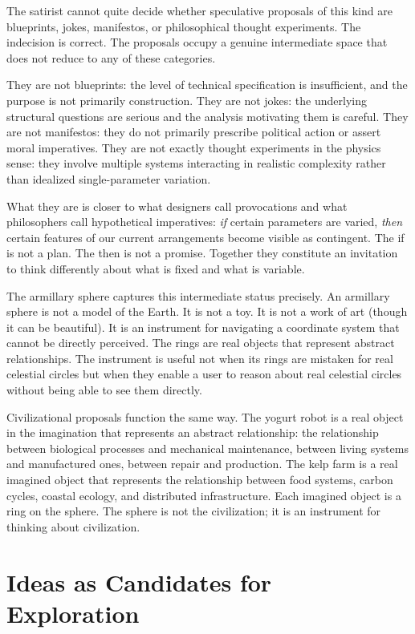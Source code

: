 \documentclass[12pt, a4paper]{article}
\theoremstyle{named}
\begin{document}
The satirist cannot quite decide whether speculative proposals of this
kind are blueprints, jokes, manifestos, or philosophical thought
experiments. The indecision is correct. The proposals occupy a genuine
intermediate space that does not reduce to any of these categories.

They are not blueprints: the level of technical specification is
insufficient, and the purpose is not primarily construction. They are
not jokes: the underlying structural questions are serious and the
analysis motivating them is careful. They are not manifestos: they do
not primarily prescribe political action or assert moral imperatives.
They are not exactly thought experiments in the physics sense: they
involve multiple systems interacting in realistic complexity rather than
idealized single-parameter variation.

What they are is closer to what designers call provocations and what
philosophers call hypothetical imperatives: \emph{if} certain parameters
are varied, \emph{then} certain features of our current arrangements
become visible as contingent. The if is not a plan. The then is not a
promise. Together they constitute an invitation to think differently
about what is fixed and what is variable.

The armillary sphere captures this intermediate status precisely. An
armillary sphere is not a model of the Earth. It is not a toy. It is
not a work of art (though it can be beautiful). It is an instrument
for navigating a coordinate system that cannot be directly perceived.
The rings are real objects that represent abstract relationships. The
instrument is useful not when its rings are mistaken for real celestial
circles but when they enable a user to reason about real celestial
circles without being able to see them directly.

Civilizational proposals function the same way. The yogurt robot is a
real object in the imagination that represents an abstract relationship:
the relationship between biological processes and mechanical
maintenance, between living systems and manufactured ones, between
repair and production. The kelp farm is a real imagined object that
represents the relationship between food systems, carbon cycles, coastal
ecology, and distributed infrastructure. Each imagined object is a ring
on the sphere. The sphere is not the civilization; it is an instrument
for thinking about civilization.

\section{Ideas as Candidates for Exploration}
\end{document}
